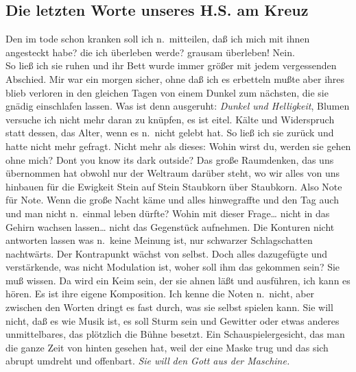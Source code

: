 \documentclass[
]{article}
\author{}
\date{\vspace{-2.5em}}
\begin{document}
\subsection{Die letzten Worte unseres H.S. am
Kreuz}\label{die-letzten-worte-unseres-h.s.-am-kreuz}

Den im tode schon kranken soll ich n.~mitteilen, daß ich mich mit ihnen
angesteckt habe? die ich überleben werde? grausam überleben! Nein.\\
So ließ ich sie ruhen und ihr Bett wurde immer größer mit jedem
vergessenden Abschied. Mir war ein morgen sicher, ohne daß ich es
erbetteln mußte aber ihres blieb verloren in den gleichen Tagen von
einem Dunkel zum nächsten, die sie gnädig einschlafen lassen. Was ist
denn ausgeruht: \emph{Dunkel und Helligkeit}, Blumen versuche ich nicht
mehr daran zu knüpfen, es ist eitel. Kälte und Widerspruch statt dessen,
das Alter, wenn es n.~nicht gelebt hat. So ließ ich sie zurück und hatte
nicht mehr gefragt. Nicht mehr als dieses: Wohin wirst du, werden sie
gehen ohne mich? Don\textquotesingle t you know it\textquotesingle s
dark outside? Das große Raumdenken, das uns übernommen hat obwohl nur
der Weltraum darüber steht, wo wir alles von uns hinbauen für die
Ewigkeit Stein auf Stein Staubkorn über Staubkorn. Also Note für Note.
Wenn die große Nacht käme und alles hinwegraffte und den Tag auch und
man nicht n.~einmal leben dürfte? Wohin mit dieser Frage\ldots{} nicht
in das Gehirn wachsen lassen\ldots{} nicht das Gegenstück aufnehmen. Die
Konturen nicht antworten lassen was n.~keine Meinung ist, nur schwarzer
Schlagschatten nachtwärts. Der Kontrapunkt wächst von selbst. Doch alles
dazugefügte und verstärkende, was nicht Modulation ist, woher soll ihm
das gekommen sein? Sie muß wissen. Da wird ein Keim sein, der sie ahnen
läßt und ausführen, ich kann es hören. Es ist ihre eigene Komposition.
Ich kenne die Noten n.~nicht, aber zwischen den Worten dringt es fast
durch, was sie selbst spielen kann. Sie will nicht, daß es wie Musik
ist, es soll Sturm sein und Gewitter oder etwas anderes unmittelbares,
das plötzlich die Bühne besetzt. Ein Schauspielergesicht, das man die
ganze Zeit von hinten gesehen hat, weil der eine Maske trug und das sich
abrupt umdreht und offenbart. \emph{Sie will} \emph{den Gott aus der
Maschine.}
\end{document}
